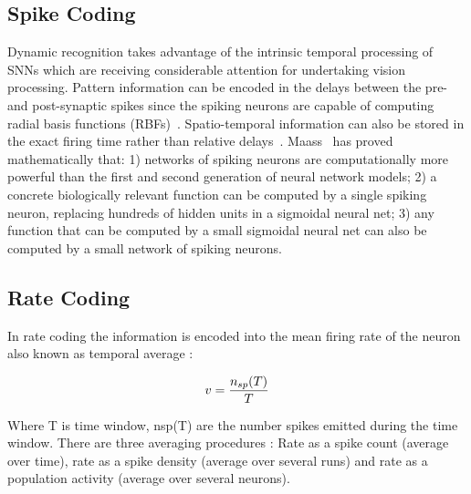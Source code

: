 \subsection{Spike Coding}
Dynamic recognition takes advantage of the intrinsic temporal processing of SNNs which are receiving considerable attention for  undertaking vision processing.
Pattern information can be encoded in the delays between the pre- and post-synaptic spikes since the spiking neurons are capable of computing radial basis functions (RBFs)~\cite{hopfield1995pattern}.
Spatio-temporal information can also be stored in the exact firing time rather than relative delays~\cite{natschlager1998spatial}.
Maass~\cite{maass1997networks} has proved mathematically that:
1) networks of spiking neurons are computationally more powerful than the first and second generation of neural network models;
2) a concrete biologically relevant function can be computed by a single spiking neuron, replacing  hundreds of hidden units in a sigmoidal neural net;
3) any function that can be computed by a small sigmoidal neural net can also be computed by a small network of spiking neurons.
\subsection{Rate Coding}

In rate coding the information is encoded into the mean firing rate of the neuron also known as temporal average \cite{gernstbook}:

\begin{equation} \label{eq:lif2}
v = {{n_{sp}(T)} \over T}
\end{equation}

Where T is time window, nsp(T) are the number spikes emitted during the time window. There are three averaging procedures \cite{gernstbook}: Rate as a spike count (average over time), rate as a spike density (average over several runs) and rate as a population activity (average over several neurons).

